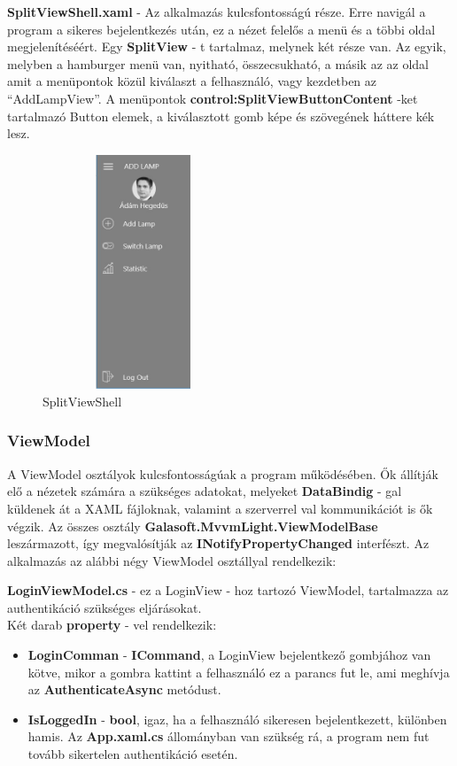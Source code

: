 \documentclass[a4paper,12pt]{report}
\begin{document}
    \textbf{SplitViewShell.xaml} - Az alkalmazás kulcsfontosságú része. Erre navigál a program a sikeres bejelentkezés után, ez a nézet
    felelős a menü és a többi oldal megjelenítéséért. Egy \textbf{SplitView} - t tartalmaz, melynek két része van. Az egyik, melyben a hamburger
    menü van, nyitható, összecsukható, a másik az az oldal amit a menüpontok közül kiválaszt a felhasználó, vagy kezdetben az ``AddLampView''.
    A menüpontok \textbf{control:SplitViewButtonContent} -ket tartalmazó Button elemek, a kiválasztott gomb képe és szövegének háttere kék lesz.

\begin{figure}[H]
    \centering
    \includegraphics[width=6cm,height=7cm,keepaspectratio]{images/hamburgermenu.jpg}
    \caption{SplitViewShell}
    \label{fig: SplitViewShell}
\end{figure}

\subsubsection{ViewModel}
    A ViewModel osztályok kulcsfontosságúak a program működésében. Ők állítják elő a nézetek számára a szükséges adatokat, melyeket \textbf{DataBindig} - gal
    küldenek át a XAML fájloknak, valamint a szerverrel val kommunikációt is ők végzik. Az összes osztály \textbf{Galasoft.MvvmLight.ViewModelBase} leszármazott, így
    megvalósítják az \textbf{INotifyPropertyChanged} interfészt. Az alkalmazás az alábbi négy ViewModel osztállyal rendelkezik:

    \textbf{LoginViewModel.cs} - ez a LoginView - hoz tartozó ViewModel, tartalmazza az authentikáció szükséges eljárásokat. \\

    Két darab \textbf{property} - vel rendelkezik:

\begin{itemize}
    \item \textbf{LoginComman} - \textbf{ICommand}, a LoginView bejelentkező gombjához van kötve, mikor a gombra kattint a felhasználó
    ez a parancs fut le, ami meghívja az \textbf{AuthenticateAsync} metódust.
    \item \textbf{IsLoggedIn} - \textbf{bool}, igaz, ha a felhasználó sikeresen bejelentkezett, különben hamis. Az \textbf{App.xaml.cs}
    állományban van szükség rá, a program nem fut tovább sikertelen authentikáció esetén.
\end{itemize}
\end{document}

